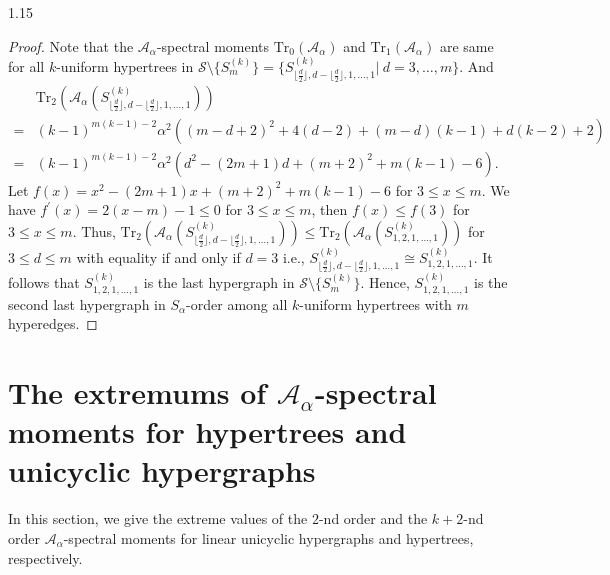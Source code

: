 \documentclass[preprint,12pt]{elsarticle1}
\newtheorem{remark}[thm]{Remark}
\numberwithin{equation}{section}
\begin{document}
\begin{spacing}{1.15}
\begin{proof}
Note that the $\mathcal{A}_{\alpha}$-spectral moments $\mathrm{Tr}_0(\mathcal{A}_{\alpha})$ and $\mathrm{Tr}_1(\mathcal{A}_{\alpha})$ are same for all $k$-uniform hypertrees in $\mathcal{S}\setminus\{S_{m}^{(k)}\}=\{S_{\lfloor\frac{d}{2}\rfloor,d-\lfloor\frac{d}{2}\rfloor,1,\ldots,1}^{(k)}|\ d=3,\ldots,m\}$. And
\begin{align*}
&\mathrm{Tr}_{2}(\mathcal{A}_{\alpha}(S_{\lfloor\frac{d}{2}\rfloor,d-\lfloor\frac{d}{2}\rfloor,1,\ldots,1}^{(k)}))\\
=&(k-1)^{m(k-1)-2}\alpha^2\left( (m-d+2)^2+4(d-2)+(m-d)(k-1)+d(k-2)+2 \right)\\
=&(k-1)^{m(k-1)-2}\alpha^2\left( d^2-(2m+1)d+(m+2)^2+m(k-1)-6 \right).
\end{align*}
Let $f(x)=x^2-(2m+1)x+(m+2)^2+m(k-1)-6$ for $3\le x\le m$. We have $f^{'}(x)=2(x-m)-1\le0$ for $3\le x\le m$, then $f(x)\le f(3)$ for $3\le x\le m$. Thus, $\mathrm{Tr}_{2}(\mathcal{A}_{\alpha}(S_{\lfloor\frac{d}{2}\rfloor,d-\lfloor\frac{d}{2}\rfloor,1,\ldots,1}^{(k)}))\le\mathrm{Tr}_{2}(\mathcal{A}_{\alpha}(S_{1,2,1,\ldots,1}^{(k)}))$ for $3\le d\le m$ with equality if and only if $d=3$ i.e., $S_{\lfloor\frac{d}{2}\rfloor,d-\lfloor\frac{d}{2}\rfloor,1,\ldots,1}^{(k)}\cong S_{1,2,1,\ldots,1}^{(k)}$. It follows that $S_{1,2,1,\ldots,1}^{(k)}$ is the last hypergraph in $\mathcal{S}\setminus\{S_{m}^{(k)}\}$.
Hence, $S_{1,2,1,\ldots,1}^{(k)}$ is the second last hypergraph in $S_{\alpha}$-order among all $k$-uniform hypertrees with $m$ hyperedges.
\end{proof}




\section{The extremums of $\mathcal{A}_{\alpha}$-spectral moments for hypertrees and unicyclic hypergraphs}
In this section, we give the extreme values of the $2$-nd order and the $k+2$-nd order $\mathcal{A}_{\alpha}$-spectral moments for linear unicyclic hypergraphs and hypertrees, respectively.


\end{spacing}
\end{document}
